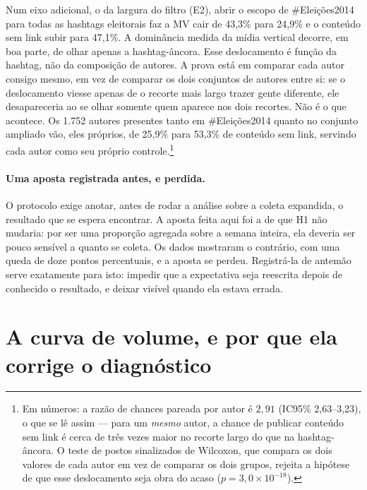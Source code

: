 Num eixo adicional, o da largura do filtro (E2), abrir o escopo de \#Eleições2014
para todas as hashtags eleitorais faz a MV cair de 43,3\% para 24,9\% e o conteúdo
sem link subir para 47,1\%. A dominância medida da mídia vertical decorre, em boa
parte, de olhar apenas a hashtag-âncora. Esse deslocamento é função da hashtag,
não da composição de autores. A prova está em comparar cada autor consigo mesmo,
em vez de comparar os dois conjuntos de autores entre si: se o deslocamento viesse
apenas de o recorte mais largo trazer gente diferente, ele desapareceria ao se
olhar somente quem aparece nos dois recortes. Não é o que acontece. Os 1.752
autores presentes tanto em \#Eleições2014 quanto no conjunto ampliado vão, eles
próprios, de 25,9\% para 53,3\% de conteúdo sem link, servindo cada autor como seu
próprio controle.\footnote{Em números: a razão de chances pareada por autor é
$2{,}91$ (IC95\% 2,63--3,23), o que se lê assim --- para um \emph{mesmo} autor, a
chance de publicar conteúdo sem link é cerca de três vezes maior no recorte largo do
que na hashtag-âncora. O teste de postos sinalizados de Wilcoxon, que compara os dois
valores de cada autor em vez de comparar os dois grupos, rejeita a hipótese de que
esse deslocamento seja obra do acaso ($p=3{,}0\times10^{-18}$).}

\paragraph{Uma aposta registrada antes, e perdida.} O protocolo exige anotar, antes
de rodar a análise sobre a coleta expandida, o resultado que se espera encontrar.
A aposta feita aqui foi a de que H1 não mudaria: por ser uma proporção agregada
sobre a semana inteira, ela deveria ser pouco sensível a quanto se coleta. Os dados
mostraram o contrário, com uma queda de doze pontos percentuais, e a aposta se
perdeu. Registrá-la de antemão serve exatamente para isto: impedir que a
expectativa seja reescrita depois de conhecido o resultado, e deixar visível quando
ela estava errada.

\section{A curva de volume, e por que ela corrige o diagnóstico}
\label{sec:curva-midia}

